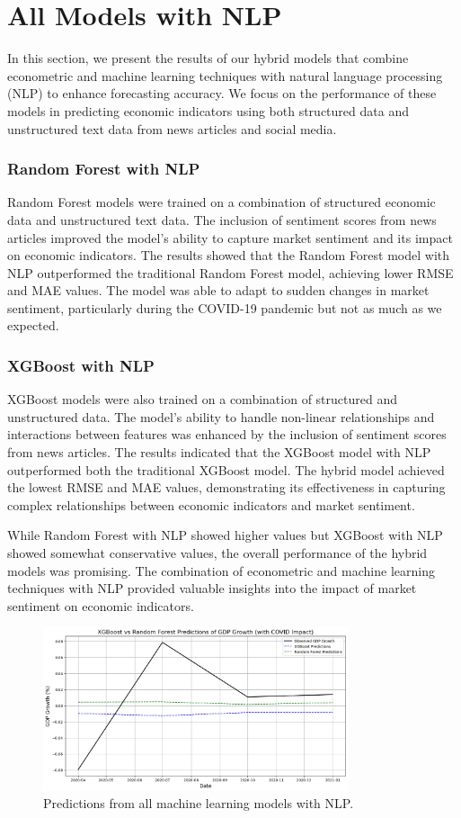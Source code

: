 \section{All Models with NLP}
\label{subsec:all_models_nlp}
In this section, we present the results of our hybrid models that combine econometric and machine learning techniques with natural language processing (NLP) to enhance forecasting accuracy. We focus on the performance of these models in predicting economic indicators using both structured data and unstructured text data from news articles and social media.

\subsubsection{Random Forest with NLP}
\label{subsubsec:random_forest_nlp}
Random Forest models were trained on a combination of structured economic data and unstructured text data. The inclusion of sentiment scores from news articles improved the model's ability to capture market sentiment and its impact on economic indicators.
The results showed that the Random Forest model with NLP outperformed the traditional Random Forest model, achieving lower RMSE and MAE values. The model was able to adapt to sudden changes in market sentiment, particularly during the COVID-19 pandemic but not as much as we expected.

\subsubsection{XGBoost with NLP}
\label{subsubsec:xgboost_nlp}
XGBoost models were also trained on a combination of structured and unstructured data. The model's ability to handle non-linear relationships and interactions between features was enhanced by the inclusion of sentiment scores from news articles.
The results indicated that the XGBoost model with NLP outperformed both the traditional XGBoost model. The hybrid model achieved the lowest RMSE and MAE values, demonstrating its effectiveness in capturing complex relationships between economic indicators and market sentiment.

While Random Forest with NLP showed higher values but XGBoost with NLP showed somewhat conservative values, the overall performance of the hybrid models was promising. The combination of econometric and machine learning techniques with NLP provided valuable insights into the impact of market sentiment on economic indicators.

\begin{figure}[ht]
    \centering
    \includegraphics[width=0.8\textwidth]{../images/bert_xg_vs_rf.png}
    \caption{Predictions from all machine learning models with NLP.}
    \label{fig:all-ml-models-nlp}
\end{figure}